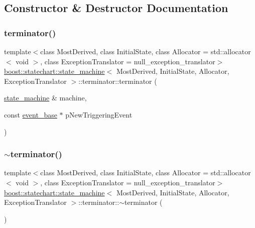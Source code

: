 \subsection{Constructor \& Destructor Documentation}
\mbox{\label{classboost_1_1statechart_1_1state__machine_1_1terminator_a0cf8b5013d4f8c1d39002623b9a76d1d}} 
\subsubsection{\texorpdfstring{terminator()}{terminator()}}
{\footnotesize\ttfamily template$<$class Most\+Derived, class Initial\+State, class Allocator = std\+::allocator$<$ void $>$, class Exception\+Translator = null\+\_\+exception\+\_\+translator$>$ \\
\mbox{\hyperlink{classboost_1_1statechart_1_1state__machine}{boost\+::statechart\+::state\+\_\+machine}}$<$ Most\+Derived, Initial\+State, Allocator, Exception\+Translator $>$\+::terminator\+::terminator (\begin{DoxyParamCaption}\item[{\mbox{\hyperlink{classboost_1_1statechart_1_1state__machine}{state\+\_\+machine}} \&}]{machine,  }\item[{const \mbox{\hyperlink{classboost_1_1statechart_1_1event__base}{event\+\_\+base}} $\ast$}]{p\+New\+Triggering\+Event }\end{DoxyParamCaption})\hspace{0.3cm}{\ttfamily [inline]}}

\mbox{\label{classboost_1_1statechart_1_1state__machine_1_1terminator_ab7fb7436ce00c95f86eae04e7680f07f}} 
\subsubsection{\texorpdfstring{$\sim$terminator()}{~terminator()}}
{\footnotesize\ttfamily template$<$class Most\+Derived, class Initial\+State, class Allocator = std\+::allocator$<$ void $>$, class Exception\+Translator = null\+\_\+exception\+\_\+translator$>$ \\
\mbox{\hyperlink{classboost_1_1statechart_1_1state__machine}{boost\+::statechart\+::state\+\_\+machine}}$<$ Most\+Derived, Initial\+State, Allocator, Exception\+Translator $>$\+::terminator\+::$\sim$terminator (\begin{DoxyParamCaption}{ }\end{DoxyParamCaption})\hspace{0.3cm}{\ttfamily [inline]}}

